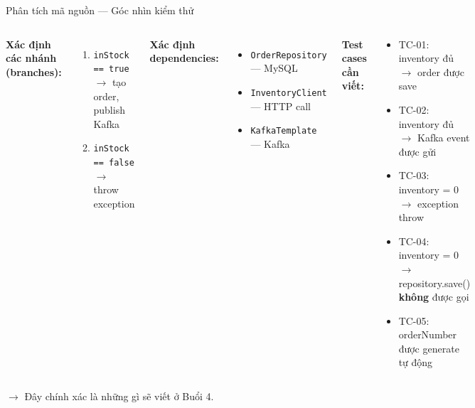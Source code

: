 \documentclass[aspectratio=169,12pt]{beamer}
\begin{document}
\begin{frame}[shrink=8]{Phân tích mã nguồn --- Góc nhìn kiểm thử}
  \begin{columns}
    \textbf{Xác định các nhánh (branches):}
    \begin{enumerate}
      \item \texttt{inStock == true} $\to$ tạo order, publish Kafka
      \item \texttt{inStock == false} $\to$ throw exception
    \end{enumerate}

    \vspace{0.5em}
    \textbf{Xác định dependencies:}
    \begin{itemize}
      \item \texttt{OrderRepository} --- MySQL
      \item \texttt{InventoryClient} --- HTTP call
      \item \texttt{KafkaTemplate} --- Kafka
    \end{itemize}

    \textbf{Test cases cần viết:}
    \begin{exampleblock}{}
      \begin{itemize}
        \item TC-01: inventory đủ $\to$ order được save
        \item TC-02: inventory đủ $\to$ Kafka event được gửi
        \item TC-03: inventory = 0 $\to$ exception throw
        \item TC-04: inventory = 0 $\to$ repository.save() \textbf{không} được gọi
        \item TC-05: orderNumber được generate tự động
      \end{itemize}
    \end{exampleblock}
  \end{columns}

  \vspace{0.3em}
  {\small $\to$ Đây chính xác là những gì sẽ viết ở Buổi 4.}
\end{frame}
\end{document}
